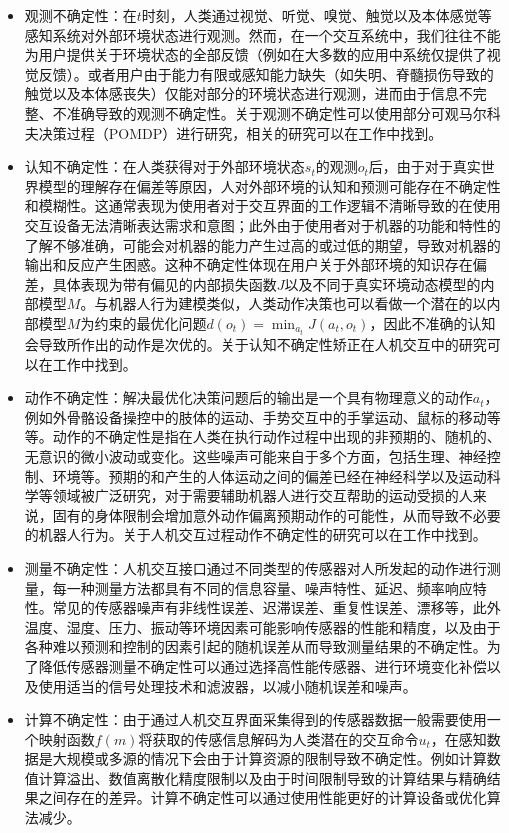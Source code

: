 \begin{itemize}
\item 观测不确定性：在$t$时刻，人类通过视觉、听觉、嗅觉、触觉以及本体感觉等感知系统对外部环境状态进行观测。然而，在一个交互系统中，我们往往不能为用户提供关于环境状态的全部反馈（例如在大多数的应用中系统仅提供了视觉反馈）。或者用户由于能力有限或感知能力缺失（如失明、脊髓损伤导致的触觉以及本体感丧失）仅能对部分的环境状态进行观测，进而由于信息不完整、不准确导致的观测不确定性。关于观测不确定性可以使用部分可观马尔科夫决策过程（POMDP）进行研究，相关的研究可以在工作\cite{torretresolsPOMDPbasedControlHybrid2022,youngPOMDPbasedStatisticalSpoken2012,zhengPOMDPModelLearning2018a}中找到。
\item 认知不确定性：在人类获得对于外部环境状态$s_t$的观测$o_t$后，由于对于真实世界模型的理解存在偏差等原因，人对外部环境的认知和预测可能存在不确定性和模糊性。这通常表现为使用者对于交互界面的工作逻辑不清晰导致的在使用交互设备无法清晰表达需求和意图；此外由于使用者对于机器的功能和特性的了解不够准确，可能会对机器的能力产生过高的或过低的期望，导致对机器的输出和反应产生困惑。这种不确定性体现在用户关于外部环境的知识存在偏差，具体表现为带有偏见的内部损失函数$J$以及不同于真实环境动态模型的内部模型$M$。与机器人行为建模类似，人类动作决策也可以看做一个潜在的以内部模型$M$为约束的最优化问题$d(o_t)=\min_{a_t} J(a_t,o_t)$，因此不准确的认知会导致所作出的动作是次优的。关于认知不确定性矫正在人机交互中的研究可以在工作\cite{gongWhatItYou2020,golubLearningInternalDynamics,raffertyInferringLearnersKnowledge,reddyWhereYouThink2018,javdaniSharedAutonomyHindsight2018}中找到。
\item 动作不确定性：解决最优化决策问题后的输出是一个具有物理意义的动作$a_t$，例如外骨骼设备操控中的肢体的运动、手势交互中的手掌运动、鼠标的移动等等。动作的不确定性是指在人类在执行动作过程中出现的非预期的、随机的、无意识的微小波动或变化。这些噪声可能来自于多个方面，包括生理、神经控制、环境等。预期的和产生的人体运动之间的偏差已经在神经科学以及运动科学等领域被广泛研究\cite{vanbeersRoleExecutionNoise2004,faisalNoiseNervousSystem2008,churchlandCentralSourceMovement2006}，对于需要辅助机器人进行交互帮助的运动受损的人来说，固有的身体限制会增加意外动作偏离预期动作的可能性，从而导致不必要的机器人行为。关于人机交互过程动作不确定性的研究可以在工作\cite{gopinathCustomizedHandlingUnintended2021,jainProbabilisticHumanIntent2020}中找到。
\item 测量不确定性：人机交互接口通过不同类型的传感器对人所发起的动作进行测量，每一种测量方法都具有不同的信息容量、噪声特性、延迟、频率响应特性。常见的传感器噪声有非线性误差、迟滞误差、重复性误差、漂移等，此外温度、湿度、压力、振动等环境因素可能影响传感器的性能和精度，以及由于各种难以预测和控制的因素引起的随机误差从而导致测量结果的不确定性。为了降低传感器测量不确定性可以通过选择高性能传感器、进行环境变化补偿以及使用适当的信号处理技术和滤波器，以减小随机误差和噪声。
\item 计算不确定性：由于通过人机交互界面采集得到的传感器数据一般需要使用一个映射函数$f(m)$将获取的传感信息解码为人类潜在的交互命令$u_t$，在感知数据是大规模或多源的情况下会由于计算资源的限制导致不确定性。例如计算数值计算溢出、数值离散化精度限制以及由于时间限制导致的计算结果与精确结果之间存在的差异。计算不确定性可以通过使用性能更好的计算设备或优化算法减少。
\end{itemize}

